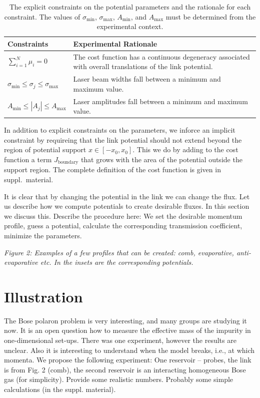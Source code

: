 \documentclass[twocolumn,amsmath,amssymb,showpacs,prl,superscriptaddress,aps]{revtex4-1}
\begin{document}
\begin{table}[t]
  \renewcommand*{\arraystretch}{1.4}
  \begin{tabular}{m{3cm}|m{5.5cm}}
    Constraints & Experimental Rationale \\
    \hline\hline
    $\sum_{i=1}^{N}\mu_i = 0$ & The cost function has a continuous degeneracy associated with overall translations of the link potential. \\
    \hline
    $\sigma_{\mathrm{min}} \leq \sigma_j \leq \sigma_{\mathrm{max}} $ & Laser beam widths fall between a minimum and maximum value.\\
    \hline
    $A_{\mathrm{min}} \leq |A_j| \leq A_{\mathrm{max}}$ & Laser amplitudes fall between a minimum and maximum value.
  \end{tabular}
  \caption{The explicit constraints on the potential parameters and the rationale for each constraint. The values of $\sigma_{\mathrm{min}}$, $\sigma_{\mathrm{max}}$, $A_{\mathrm{min}}$, and $A_{\mathrm{max}}$ must be determined from the experimental context.}
  \label{tab:constraints}
\end{table}

In addition to explicit constraints on the parameters, we inforce an implicit constraint by requireing that the link potential should not extend beyond the region  of potential support $x\in[-x_0,x_0]$. This we do by adding to the cost function a term $J_{\mathrm{boundary}}$ that grows with the area of the potential outside the support region. The complete definition of the cost function is given in suppl.~material. 



 It is clear that by changing the potential in the link we can change the flux. Let us describe how we compute potentials to create desirable fluxes. In this section we discuss this.  Describe the procedure here: We set the desirable momentum profile, guess a potential, calculate the corresponding transmission coefficient, minimize the parameters. 

{\it Figure 2: Examples of a few profiles that can be created: comb, evaporative, anti-evaporative etc. In the insets are the corresponding potentials.}

\section{Illustration}

The Bose polaron problem is very interesting, and many groups are studying it now. It is an open question how to measure the effective mass of the impurity in one-dimensional set-ups. There was one experiment, however the results are unclear. Also it is interesting to understand when the model breaks, i.e., at which momenta. We propose the following experiment: One reservoir -- probes, the link is from Fig. 2 (comb), the second reservoir is an interacting homogeneous Bose gas (for simplicity). Provide some realistic numbers. Probably some simple calculations (in the suppl. material). 
\end{document}
